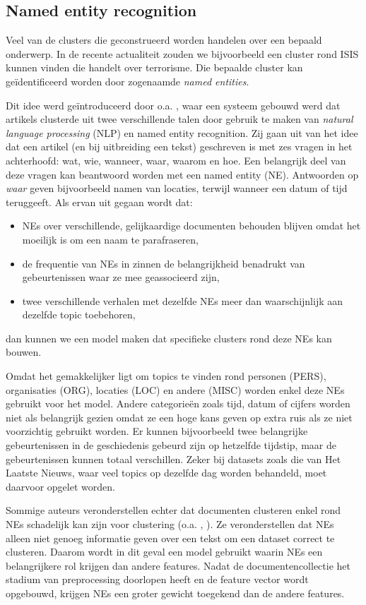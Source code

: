 \subsection{Named entity recognition}
Veel van de clusters die geconstrueerd worden handelen over een bepaald onderwerp. In de recente actualiteit zouden we bijvoorbeeld een cluster rond ISIS kunnen vinden die handelt over terrorisme. Die bepaalde cluster kan ge\"identificeerd worden door zogenaamde \textit{named entities}.

Dit idee werd ge\"introduceerd door o.a. \cite{Montalvo2015}, waar een systeem gebouwd werd dat artikels clusterde uit twee verschillende talen door gebruik te maken van \textit{natural language processing} (NLP) en named entity recognition. Zij gaan uit van het idee dat een artikel (en bij uitbreiding een tekst) geschreven is met zes vragen in het achterhoofd: wat, wie, wanneer, waar, waarom en hoe. Een belangrijk deel van deze vragen kan beantwoord worden met een named entity (NE). Antwoorden op \textit{waar} geven bijvoorbeeld namen van locaties, terwijl wanneer een datum of tijd teruggeeft. Als ervan uit gegaan wordt dat:
\begin{itemize}
\item NEs over verschillende, gelijkaardige documenten behouden blijven omdat het moeilijk is om een naam te parafraseren,
\item de frequentie van NEs in zinnen de belangrijkheid benadrukt van gebeurtenissen waar ze mee geassocieerd zijn,
\item twee verschillende verhalen met dezelfde NEs meer dan waarschijnlijk aan dezelfde topic toebehoren,
\end{itemize} dan kunnen we een model maken dat specifieke clusters rond deze NEs kan bouwen.

Omdat het gemakkelijker ligt om topics te vinden rond personen (PERS), organisaties (ORG), locaties (LOC) en andere (MISC) worden enkel deze NEs gebruikt voor het model. Andere categorie\"en zoals tijd, datum of cijfers worden niet als belangrijk gezien omdat ze een hoge kans geven op extra ruis als ze niet voorzichtig gebruikt worden. Er kunnen bijvoorbeeld twee belangrijke gebeurtenissen in de geschiedenis gebeurd zijn op hetzelfde tijdstip, maar de gebeurtenissen kunnen totaal verschillen. Zeker bij datasets zoals die van Het Laatste Nieuws, waar veel topics op dezelfde dag worden behandeld, moet daarvoor opgelet worden. 

Sommige auteurs veronderstellen echter dat documenten clusteren enkel rond NEs schadelijk kan zijn voor clustering (o.a. \cite{Friburger2002}, \cite{Gliozzo2005}). Ze veronderstellen dat NEs alleen niet genoeg informatie geven over een tekst om een dataset correct te clusteren. Daarom wordt in dit geval een model gebruikt waarin NEs een belangrijkere rol krijgen dan andere features. Nadat de documentencollectie het stadium van preprocessing doorlopen heeft en de feature vector wordt opgebouwd, krijgen NEs een groter gewicht toegekend dan de andere features. 

